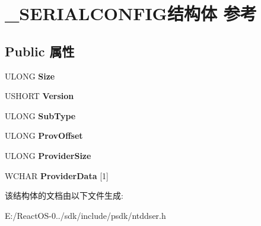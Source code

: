 \hypertarget{struct___s_e_r_i_a_l_c_o_n_f_i_g}{}\section{\+\_\+\+S\+E\+R\+I\+A\+L\+C\+O\+N\+F\+I\+G结构体 参考}
\label{struct___s_e_r_i_a_l_c_o_n_f_i_g}
\subsection*{Public 属性}
\begin{DoxyCompactItemize}
\item 
\mbox{\label{struct___s_e_r_i_a_l_c_o_n_f_i_g_a0c499683a63ea5b6d2ccf648ed8ca35d}} 
U\+L\+O\+NG {\bfseries Size}
\item 
\mbox{\label{struct___s_e_r_i_a_l_c_o_n_f_i_g_ac7a06dd6868d34744b70d3b4c7ef5b39}} 
U\+S\+H\+O\+RT {\bfseries Version}
\item 
\mbox{\label{struct___s_e_r_i_a_l_c_o_n_f_i_g_a92c8446b7f1d1e67077ac01a694eb79c}} 
U\+L\+O\+NG {\bfseries Sub\+Type}
\item 
\mbox{\label{struct___s_e_r_i_a_l_c_o_n_f_i_g_a0488f1c959723ed739da7fffef2024f1}} 
U\+L\+O\+NG {\bfseries Prov\+Offset}
\item 
\mbox{\label{struct___s_e_r_i_a_l_c_o_n_f_i_g_a2fcd31528fcb9182b44b92436e5d70a0}} 
U\+L\+O\+NG {\bfseries Provider\+Size}
\item 
\mbox{\label{struct___s_e_r_i_a_l_c_o_n_f_i_g_a57d5d4105f2b650242b13b8e0eda6903}} 
W\+C\+H\+AR {\bfseries Provider\+Data} \mbox{[}1\mbox{]}
\end{DoxyCompactItemize}


该结构体的文档由以下文件生成\+:\begin{DoxyCompactItemize}
\item 
E\+:/\+React\+O\+S-\/0../sdk/include/psdk/ntddser.\+h\end{DoxyCompactItemize}
